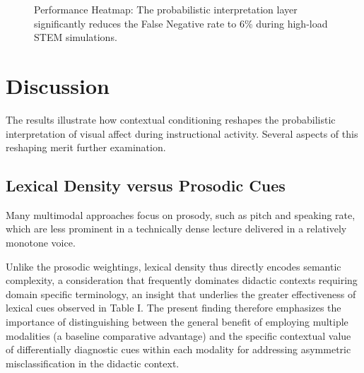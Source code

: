 \documentclass[conference]{IEEEtran}
\begin{document}
\begin{figure}[htbp]
\centering
{}
\caption{Performance Heatmap: The probabilistic interpretation layer significantly reduces the False Negative rate to 6\% during high-load STEM simulations.}
\label{fig:confusion}
\end{figure}

\section{Discussion}

The results illustrate how contextual conditioning reshapes the probabilistic interpretation of visual affect during instructional activity. Several aspects of this reshaping merit further examination.

\subsection{Lexical Density versus Prosodic Cues}
Many multimodal approaches focus on prosody, such as pitch and speaking rate, \cite{b9, b11} which are less prominent in a technically dense lecture delivered in a relatively monotone voice.

Unlike the prosodic weightings, lexical density thus directly encodes semantic complexity, a consideration that frequently dominates didactic contexts requiring domain specific terminology, an insight that underlies the greater effectiveness of lexical cues observed in Table I. The present finding therefore emphasizes the importance of distinguishing between the general benefit of employing multiple modalities (a baseline comparative advantage) and the specific contextual value of differentially diagnostic cues within each modality for addressing asymmetric misclassification in the didactic context.
\end{document}
